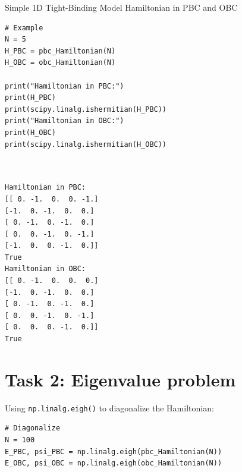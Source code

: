 \documentclass{report}
\begin{document}
\begin{Example}{Simple 1D Tight-Binding Model Hamiltonian in PBC and OBC}{}
    \begin{minipage}[t]{0.48\textwidth}
    \begin{lstlisting}[basicstyle=\ttfamily\scriptsize]
# Example
N = 5
H_PBC = pbc_Hamiltonian(N)
H_OBC = obc_Hamiltonian(N)

print("Hamiltonian in PBC:")
print(H_PBC)
print(scipy.linalg.ishermitian(H_PBC))
print("Hamiltonian in OBC:")
print(H_OBC)
print(scipy.linalg.ishermitian(H_OBC))



    \end{lstlisting}
    \end{minipage}
    \hfill
    \begin{minipage}[t]{0.48\textwidth}
    \begin{lstlisting}[basicstyle=\ttfamily\scriptsize]
Hamiltonian in PBC:
[[ 0. -1.  0.  0. -1.]
[-1.  0. -1.  0.  0.]
[ 0. -1.  0. -1.  0.]
[ 0.  0. -1.  0. -1.]
[-1.  0.  0. -1.  0.]]
True
Hamiltonian in OBC:
[[ 0. -1.  0.  0.  0.]
[-1.  0. -1.  0.  0.]
[ 0. -1.  0. -1.  0.]
[ 0.  0. -1.  0. -1.]
[ 0.  0.  0. -1.  0.]]
True
    \end{lstlisting}
    \end{minipage}
\end{Example}

\section{Task 2: Eigenvalue problem}
\setcounter{tcb@cnt@question}{0}


\sol Using \texttt{np.linalg.eigh()} to diagonalize the Hamiltonian:

\begin{lstlisting}
# Diagonalize
N = 100
E_PBC, psi_PBC = np.linalg.eigh(pbc_Hamiltonian(N))
E_OBC, psi_OBC = np.linalg.eigh(obc_Hamiltonian(N))
\end{lstlisting}


\end{document}
